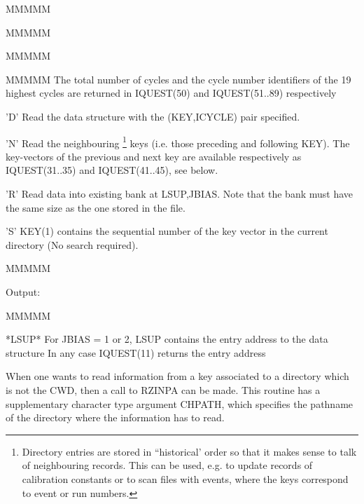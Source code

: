 \begin{DL}{MMMMM}
\begin{DL}{MMMMM}
\begin{DL}{MMMMM}
\begin{DL}{MMMMM}
\newline The total number of cycles and the cycle number identifiers
of the 19 highest cycles are returned in IQUEST(50) and IQUEST(51..89)
respectively
\item['D'
]Read the data structure with the (KEY,ICYCLE) pair specified.
\item['N'
]Read the neighbouring
\footnote{
Directory entries are stored in ``historical' order so that it
makes sense to talk of neighbouring records.
This can be used, e.g. to update records of calibration
constants or to scan files with events, where the keys correspond to
event or run numbers.
}
keys (i.e. those preceding and following KEY).
\newline The key-vectors of the previous and next key are available
respectively as IQUEST(31..35) and IQUEST(41..45), see below.
\item['R'
]Read data into existing bank at LSUP,JBIAS. Note that the bank
must have the same size as the one stored in the file.
\item['S'
]KEY(1) contains the sequential number of the key vector
in the current directory (No search required).
\end{DL}
\end{DL}
\end{DL}
\end{DL}
\begin{DL}{MMMMM}
\item[Output:
]
\begin{DL}{MMMMM}
\item[*LSUP*
]For JBIAS = 1 or 2, LSUP contains
the entry address to the data structure
\newline In any case IQUEST(11) returns the entry address
\end{DL}
\end{DL}
\par
When one wants to read information from a key associated to a directory
which is not the CWD, then a call to RZINPA can be made.
This routine has a supplementary character type argument CHPATH, which
specifies the pathname
of the directory where the information has to read.
